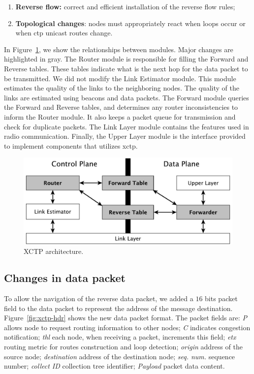\begin{enumerate}
     \item \textbf {Reverse flow:} correct and efficient installation of the reverse flow rules;
     \item \textbf {Topological changes}: nodes must appropriately react when loops occur or when \ac{ctp} unicast routes change.
\end{enumerate}

In Figure~\ref{fig:architecture}, we show the relationships between modules. Major changes are highlighted in gray. The Router module is responsible for filling the Forward and Reverse tables. These tables indicate what is the next hop for the data packet to be transmitted. We did not modify the Link Estimator module. This module estimates the quality of the links to the neighboring nodes. The quality of the links are estimated using beacons and data packets. The Forward module queries the Forward and Reverse tables, and determines any router inconsistencies to inform the Router module. It also keeps a packet queue for transmission and check for duplicate packets. The Link Layer module contains the features used in radio communication. Finally, the Upper Layer module is the interface provided to implement components that utilizes \ac{xctp}.

\begin{figure}[t]
\centerline{
    \includegraphics[width=0.8\linewidth]{img/architecture}
} \caption{XCTP architecture.} \label{fig:architecture}
\end{figure}

\subsection{Changes in data packet}
\label{sec:changes-in-data-packet}

To allow the navigation of the reverse data packet, we added a $16$ bits packet field to the data packet to represent the address of the message destination. Figure~\ref{fig:xctp-hdr} shows the new data packet format. The packet fields are: \textit{P} allows node to request routing information to other nodes; \textit{C} indicates congestion notification; \textit{\ac{thl}} each node, when receiving a packet, increments this field; \textit{\acs{etx}} routing metric for routes construction and loop detection; \textit{origin} address of the source node; \textit{destination} address of the destination node; \textit{seq. num.} sequence number; \textit{collect ID} collection tree identifier; \textit{Payload} packet data content.


